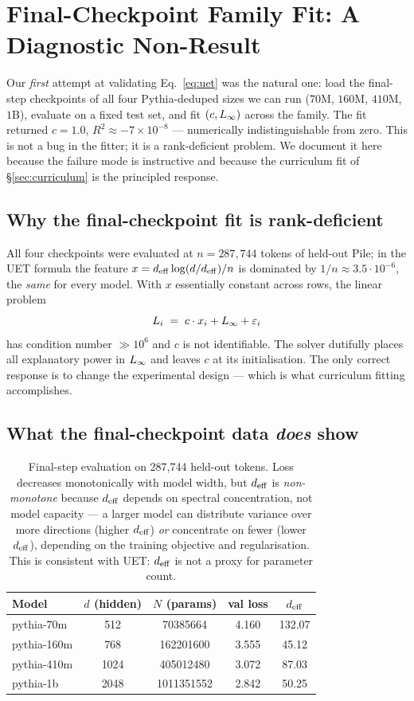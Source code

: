 \section{Final-Checkpoint Family Fit: A Diagnostic Non-Result}
\label{sec:final}

Our \emph{first} attempt at validating Eq.~\eqref{eq:uet} was the
natural one: load the final-step checkpoints of all four Pythia-deduped
sizes we can run ($70$M, $160$M, $410$M, $1$B), evaluate on a fixed
test set, and fit $(c, L_{\infty})$ across the family. The fit returned
$c = 1.0$, $R^2 \approx -7 \times 10^{-8}$ --- numerically indistinguishable
from zero. This is not a bug in the fitter; it is a rank-deficient problem.
We document it here because the failure mode is instructive and because
the curriculum fit of \S\ref{sec:curriculum} is the principled response.

\subsection{Why the final-checkpoint fit is rank-deficient}

All four checkpoints were evaluated at $n = 287{,}744$ tokens of held-out
Pile; in the UET formula the feature $x = d_{\mathrm{eff}} \log(d/d_{\mathrm{eff}})/n$ is
dominated by $1/n \approx 3.5 \cdot 10^{-6}$, the \emph{same} for every
model. With $x$ essentially constant across rows, the linear problem
\[
L_i \;=\; c \cdot x_i + L_{\infty} + \varepsilon_i
\]
has condition number $\gg 10^{6}$ and $c$ is not identifiable. The
solver dutifully places all explanatory power in $L_{\infty}$ and leaves
$c$ at its initialisation. The only correct response is to change the
experimental design --- which is what curriculum fitting accomplishes.

\subsection{What the final-checkpoint data \emph{does} show}

\begin{table}[H]
\centering
\small
\begin{tabular}{lSSSS}
\toprule
Model & {$d$ (hidden)} & {$N$ (params)} & {val loss} & {$\deff$} \\
\midrule
pythia-70m   & 512  & 70385664   & 4.160 & 132.07 \\
pythia-160m  & 768  & 162201600  & 3.555 & 45.12  \\
pythia-410m  & 1024 & 405012480  & 3.072 & 87.03  \\
pythia-1b    & 2048 & 1011351552 & 2.842 & 50.25  \\
\bottomrule
\end{tabular}
\caption{Final-step evaluation on 287{,}744 held-out tokens.
Loss decreases monotonically with model width, but $\deff$ is
\emph{non-monotone} because $\deff$ depends on spectral concentration,
not model capacity --- a larger model can distribute variance over more
directions (higher $\deff$) \emph{or} concentrate on fewer (lower
$\deff$), depending on the training objective and regularisation. This
is consistent with UET: $\deff$ is not a proxy for parameter count.}
\label{tab:scaling-final}
\end{table}


